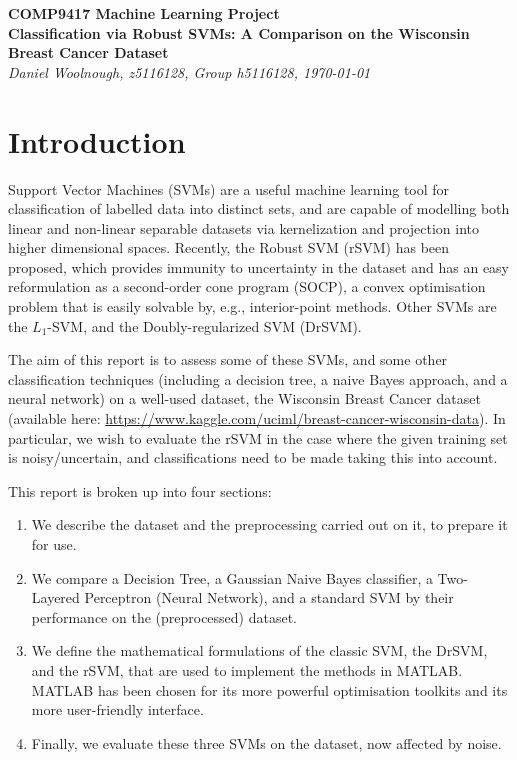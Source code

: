 \documentclass[11pt]{article}
\begin{document}
\begin{center}
\textbf{\large{COMP9417 Machine Learning Project}}
\\[10pt]
\textbf{\huge{Classification via Robust SVMs: A Comparison on the Wisconsin Breast Cancer Dataset}}
\\[10pt]
{\it \large{Daniel Woolnough, z5116128, Group h5116128, \today}}
\end{center}
\section*{Introduction}
Support Vector Machines (SVMs) are a useful machine learning tool for classification of labelled data into distinct sets, and are capable of modelling both linear and non-linear separable datasets via kernelization and projection into higher dimensional spaces. Recently, the Robust SVM (rSVM) has been proposed, which provides immunity to uncertainty in the dataset and has an easy reformulation as a second-order cone program (SOCP), a convex optimisation problem that is easily solvable by, e.g., interior-point methods. Other SVMs are the $L_1$-SVM, and the Doubly-regularized SVM (DrSVM). 

The aim of this report is to assess some of these SVMs, and some other classification techniques (including a decision tree, a naive Bayes approach, and a neural network) on a well-used dataset, the Wisconsin Breast Cancer dataset (available here: \url{https://www.kaggle.com/uciml/breast-cancer-wisconsin-data}). In particular, we wish to evaluate the rSVM in the case where the given training set is noisy/uncertain, and classifications need to be made taking this into account. 

This report is broken up into four sections:
\begin{enumerate}
	\item We describe the dataset and the preprocessing carried out on it, to prepare it for use. 
	\item We compare a Decision Tree, a Gaussian Naive Bayes classifier, a Two-Layered Perceptron (Neural Network), and a standard SVM by their performance on the (preprocessed) dataset. 
	\item We define the mathematical formulations of the classic SVM, the DrSVM, and the rSVM, that are used to implement the methods in MATLAB. MATLAB has been chosen for its more powerful optimisation toolkits and its more user-friendly interface. 
	\item Finally, we evaluate these three SVMs on the dataset, now affected by noise. 
\end{enumerate}
\end{document}

